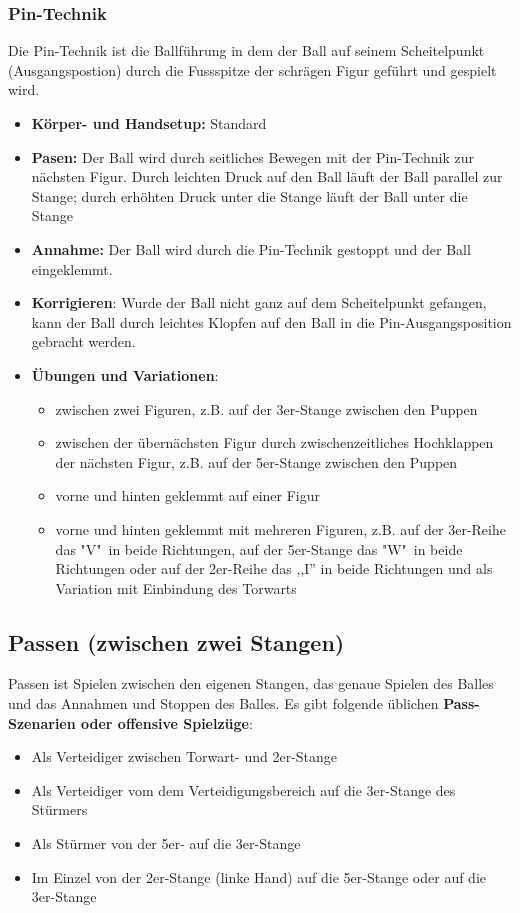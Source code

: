 \subsubsection{Pin-Technik}
\label{technik:offensive:eine:pin}
Die Pin-Technik ist die Ballführung in dem der Ball auf seinem Scheitelpunkt (Ausgangspostion) durch die Fussspitze der schrägen Figur geführt und gespielt wird.
\begin{itemize}
    \item \textbf{Körper- und Handsetup:} Standard 
    \item \textbf{Pasen:} Der Ball wird durch seitliches Bewegen mit der Pin-Technik zur nächsten Figur. Durch leichten Druck auf den Ball läuft der Ball parallel zur Stange; durch erhöhten Druck unter die Stange läuft der Ball unter die Stange
    \item \textbf{Annahme:} Der Ball wird durch die Pin-Technik gestoppt und der Ball eingeklemmt.
    \item \textbf{Korrigieren}: Wurde der Ball nicht ganz auf dem Scheitelpunkt gefangen, kann der Ball durch leichtes Klopfen auf den Ball in die Pin-Ausgangsposition gebracht werden.
    \item \textbf{Übungen und Variationen}:
        \begin{itemize}
            \item zwischen zwei Figuren, z.B. auf der 3er-Stange zwischen den Puppen
            \item zwischen der übernächsten Figur durch zwischenzeitliches Hochklappen der nächsten Figur, z.B. auf der 5er-Stange zwischen den Puppen
            \item vorne und hinten geklemmt auf einer Figur
            \item vorne und hinten geklemmt mit mehreren Figuren, z.B. auf der 3er-Reihe das "V"\  in beide Richtungen, auf der 5er-Stange das "W"\ in beide Richtungen oder auf der 2er-Reihe das ,,I'' in beide Richtungen und als Variation mit Einbindung des Torwarts
        \end{itemize}
\end{itemize}

\subsection{Passen (zwischen zwei Stangen)}
\label{technik:offensive:zwei}

Passen ist Spielen zwischen den eigenen Stangen, das genaue Spielen des Balles und das Annahmen und Stoppen des Balles.
Es gibt folgende üblichen \textbf{Pass-Szenarien oder offensive Spielzüge}:
\begin{itemize}
    \item Als Verteidiger zwischen Torwart- und 2er-Stange
    \item Als Verteidiger vom dem Verteidigungsbereich auf die 3er-Stange des Stürmers
    \item Als Stürmer von der 5er- auf die 3er-Stange
    \item Im Einzel von der 2er-Stange (linke Hand) auf die 5er-Stange oder auf die 3er-Stange
\end{itemize}

